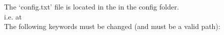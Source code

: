 


\noindent The `config.txt' file is located in the \InstallDIR in the config folder. \\

i.e. at  \\

\noindent The following keywords must be changed (and must be a valid path):

\noindent\fboxsep=0pt%

